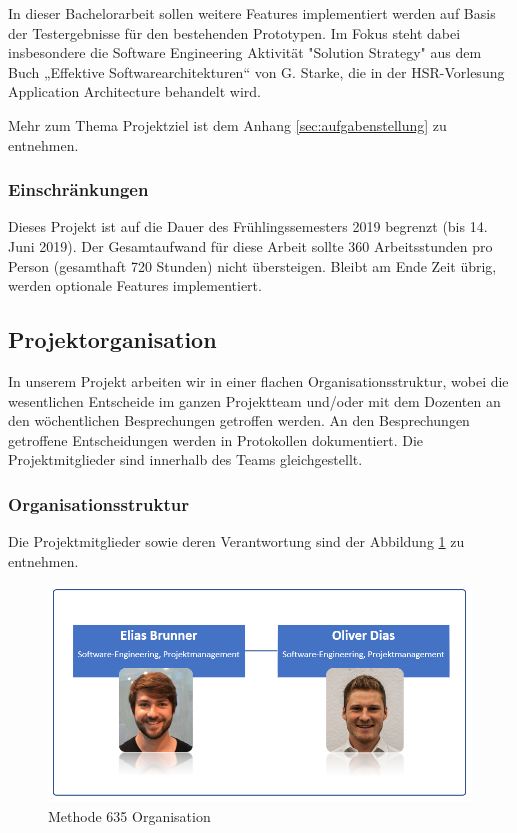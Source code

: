 In dieser Bachelorarbeit sollen weitere Features implementiert werden auf Basis der Testergebnisse für den bestehenden Prototypen. Im Fokus steht dabei insbesondere die Software Engineering Aktivität "Solution Strategy" aus dem Buch „Effektive Softwarearchitekturen“ von G. Starke, die in der HSR-Vorlesung Application Architecture behandelt wird.

Mehr zum Thema Projektziel ist dem Anhang \ref{sec:aufgabenstellung} zu entnehmen.

\subsubsection*{Einschränkungen}
Dieses Projekt ist auf die Dauer des Frühlingssemesters 2019 begrenzt (bis 14. Juni 2019). Der Gesamtaufwand für diese Arbeit sollte 360 Arbeitsstunden pro Person (gesamthaft 720 Stunden) nicht übersteigen. Bleibt am Ende Zeit übrig, werden optionale Features implementiert.

\subsection{Projektorganisation}
In unserem Projekt arbeiten wir in einer flachen Organisationsstruktur, wobei die wesentlichen Entscheide im ganzen Projektteam und/oder mit dem Dozenten an den wöchentlichen Besprechungen getroffen werden. An den Besprechungen getroffene Entscheidungen werden in Protokollen dokumentiert. Die Projektmitglieder sind innerhalb des Teams gleichgestellt.

\subsubsection*{Organisationsstruktur}
Die Projektmitglieder sowie deren Verantwortung sind der Abbildung \ref{fig:organisation} zu entnehmen.
\begin{figure}[h]
	\centering
	\includegraphics[width=1\linewidth]{img/projekt-plan/organisation}
	\caption[Organisation Methode 635]{Methode 635 Organisation}
	\label{fig:organisation}
\end{figure}


